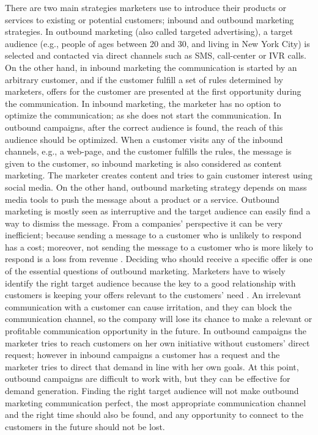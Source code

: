 \documentclass[11pt]{article}
\begin{document}
There are two main strategies marketers use to introduce their products or services to existing or potential customers; inbound and outbound marketing strategies. In outbound marketing (also called targeted advertising), a target audience (e.g., people of ages between 20 and 30, and living in New York City) is selected and contacted via direct channels such as SMS, call-center or IVR calls. On the other hand, in inbound marketing the communication is started by an arbitrary customer, and if the customer fulfill a set of rules determined by marketers, offers for the customer are presented at the first opportunity during the communication. In inbound marketing, the marketer has no option to optimize the communication; as she does not start the communication. In outbound campaigns, after the correct audience is found, the reach of this audience should be optimized. When a customer visits any of the inbound channels, e.g., a web-page, and the customer fulfills the rules, the message is given to the customer, so inbound marketing is also considered as content marketing. The marketer creates content and tries to gain customer interest using social media. On the other hand, outbound marketing strategy depends on mass media tools to push the message about a product or a service. Outbound marketing is mostly seen as interruptive and the target audience can easily find a way to dismiss the message. From a companies’ perspective it can be very inefficient; because sending a message to a customer who is unlikely to respond has a cost; moreover, not sending the message to a customer who is more likely to respond is a loss from revenue \citep{sarkar}. Deciding who should receive a specific offer is one of the essential questions of outbound marketing. Marketers have to wisely identify the right target audience because the key to a good relationship with customers is keeping your offers relevant to the customers’ need \citep{malthouse}. An irrelevant communication with a customer can cause irritation, and they can block the communication channel, so the company will lose its chance to make a relevant or profitable communication opportunity in the future. In outbound campaigns the marketer tries to reach customers on her own initiative without customers' direct request; however in inbound campaigns a customer has a request and the marketer tries to direct that demand in line with her own goals. At this point, outbound campaigns are difficult to work with, but they can be effective for demand generation. Finding the right target audience will not make outbound marketing communication perfect, the most appropriate communication channel and the right time should also be found, and any opportunity to connect to the customers in the future should not be lost.\\
\end{document}
